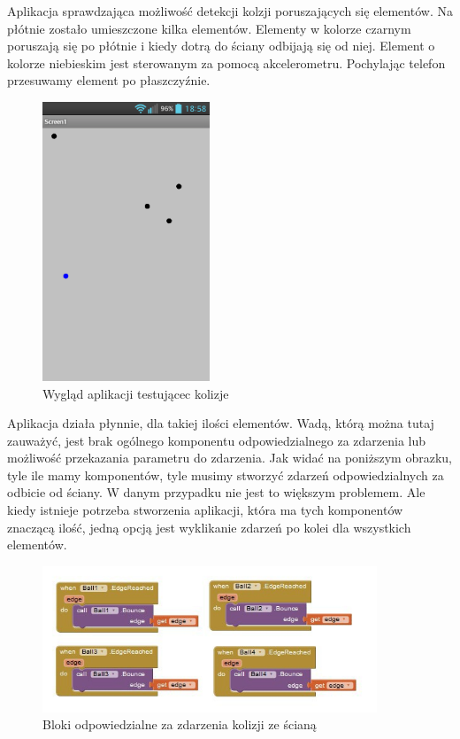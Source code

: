 Aplikacja sprawdzająca możliwość detekcji kolzji poruszających się elementów. Na płótnie zostało umieszczone kilka elementów. Elementy w kolorze czarnym poruszają się po płótnie i kiedy dotrą do ściany odbijają się od niej. Element o kolorze niebieskim jest sterowanym za pomocą akcelerometru. Pochylając telefon przesuwamy element po płaszczyźnie.

\begin{figure}[H]
\centering\includegraphics[width=5cm]{figures/apps/ai_collision}
\caption{Wygląd aplikacji testującec kolizje}
\end{figure}

Aplikacja działa płynnie, dla takiej ilości elementów. Wadą, którą można tutaj zauważyć, jest brak ogólnego komponentu odpowiedzialnego za zdarzenia lub możliwość przekazania parametru do zdarzenia. Jak widać na poniższym obrazku, tyle ile mamy komponentów, tyle musimy stworzyć zdarzeń odpowiedzialnych za odbicie od ściany. W danym przypadku nie jest to większym problemem. Ale kiedy istnieje potrzeba stworzenia aplikacji, która ma tych komponentów znaczącą ilość, jedną opcją jest wyklikanie zdarzeń po kolei dla wszystkich elementów.


\begin{figure}[H]
\centering\includegraphics[width=10cm]{figures/apps/ai_collision_blocks}
\caption{Bloki odpowiedzialne za zdarzenia kolizji ze ścianą}
\end{figure}

